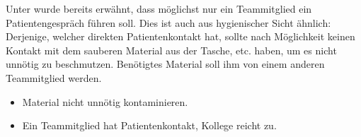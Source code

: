 {
Unter  wurde bereits erwähnt, dass möglichst nur
ein Teammitglied ein Patientengespräch führen soll. Dies ist auch aus
hygienischer Sicht ähnlich: Derjenige, welcher direkten Patientenkontakt hat,
sollte nach Möglichkeit keinen Kontakt mit dem sauberen Material aus der
Tasche, etc. haben, um es nicht unnötig zu beschmutzen. Benötigtes Material soll
ihm von einem anderen Teammitglied  werden. 

}{
\begin{itemize}
  \item Material nicht unnötig kontaminieren. 
  \item Ein Teammitglied hat Patientenkontakt, Kollege reicht zu.
\end{itemize}
}{}{}{}

